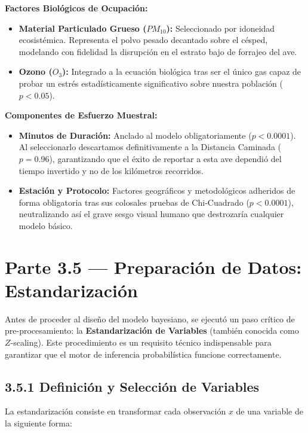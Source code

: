 \documentclass[12pt]{article}
\begin{document}
\textbf{Factores Biológicos de Ocupación:}
\begin{itemize}
    \item \textbf{Material Particulado Grueso ($PM_{10}$):} Seleccionado por idoneidad ecosistémica. Representa el polvo pesado decantado sobre el césped, modelando con fidelidad la disrupción en el estrato bajo de forrajeo del ave.
    \item \textbf{Ozono ($O_3$):} Integrado a la ecuación biológica tras ser el único gas capaz de probar un estrés estadísticamente significativo sobre nuestra población ($p < 0.05$).
\end{itemize}

\textbf{Componentes de Esfuerzo Muestral:}
\begin{itemize}
    \item \textbf{Minutos de Duración:} Anclado al modelo obligatoriamente ($p < 0.0001$). Al seleccionarlo descartamos definitivamente a la Distancia Caminada ($p=0.96$), garantizando que el éxito de reportar a esta ave dependió del tiempo invertido y no de los kilómetros recorridos.
    \item \textbf{Estación y Protocolo:} Factores geográficos y metodológicos adheridos de forma obligatoria tras sus colosales pruebas de Chi-Cuadrado ($p < 0.0001$), neutralizando así el grave sesgo visual humano que destrozaría cualquier modelo básico.
\end{itemize}

\vspace{0.5cm}

\section{Parte 3.5 --- Preparación de Datos: Estandarización}

Antes de proceder al diseño del modelo bayesiano, se ejecutó un paso crítico de pre-procesamiento: la \textbf{Estandarización de Variables} (también conocida como $Z$-scaling). Este procedimiento es un requisito técnico indispensable para garantizar que el motor de inferencia probabilística funcione correctamente.

\subsection*{3.5.1 Definición y Selección de Variables}
La estandarización consiste en transformar cada observación $x$ de una variable de la siguiente forma:
\end{document}
